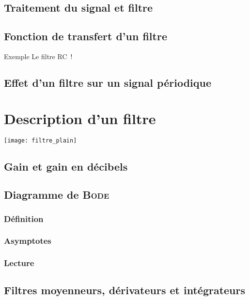 \documentclass[../main/main.tex]{subfiles}
\begin{document}
\subsection{Traitement du signal et filtre}

\subsection{Fonction de transfert d'un filtre}

\begin{rexem}{Exemple}
    Le filtre RC~!
\end{rexem}

\subsection{Effet d'un filtre sur un signal périodique}


\section{Description d'un filtre}

\begin{center}
    \texttt{[image: filtre\_plain]}
\end{center}

\subsection{Gain et gain en décibels}

\subsection{Diagramme de \textsc{Bode}}
\subsubsection{Définition}

\subsubsection{Asymptotes}

\subsubsection{Lecture}

\subsection{Filtres moyenneurs, dérivateurs et intégrateurs}
\end{document}
